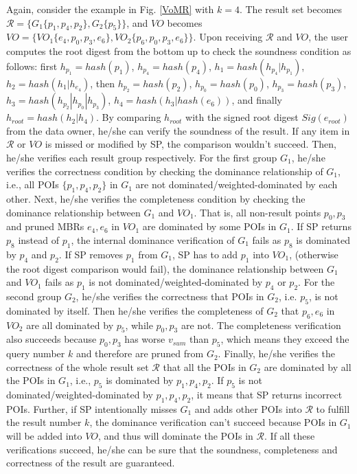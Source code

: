 \documentclass[10pt, conference, compsocconf]{IEEEtran}
\begin{document}
Again, consider the example in Fig. \ref{VoMR} with $k=4$. The result set becomes $\mathcal{R} = \{G_1\{p_{1}, p_{4}, p_{2}\}, G_2\{p_{5}\}\}$, and $VO$ becomes $VO= \{VO_1\{e_{4}, p_{0}, p_{3}, e_{6}\},VO_2\{p_{6}, p_{0}, p_{3}, e_{6}\}\}$. Upon receiving $\mathcal{R}$ and $VO$, the user computes the root digest from the bottom up to check the soundness condition as follows: first $h_{p_1} = hash(p_1)$, $h_{p_4} = hash(p_4)$, $h_{1} = hash(h_{p_4}|h_{p_1})$, $h_{2} = hash(h_1|h_{e_4})$, then $h_{p_2} = hash(p_2)$, $h_{p_0} = hash(p_0)$, $h_{p_3} = hash(p_3)$, $h_{3} =hash(h_{p_2}|h_{p_0}|h_{p_3}) $, $h_4 = hash(h_3 | hash(e_6))$, and finally $h_{root} = hash(h_{2} | h_{4})$. By comparing $h_{root}$ with the signed root digest $Sig(e_{root})$ from the data owner, he/she can verify the soundness of the result. If any item in $\mathcal{R}$ or $VO$ is missed or modified by SP, the comparison wouldn't succeed. Then, he/she verifies each result group respectively. For the first group $G_1$, he/she verifies the correctness condition by checking the dominance relationship of $G_1$, i.e., all POIs $\{p_1, p_4, p_2\}$ in $G_1$ are not dominated/weighted-dominated by each other. Next, he/she verifies the completeness condition by checking the dominance relationship between $G_1$ and $VO_1$. That is, all non-result points $p_0, p_3$ and pruned MBRs $e_4, e_6$ in $VO_1$ are dominated by some POIs in $G_1$. If SP returns $p_8$ instead of $p_1$, the internal dominance verification of $G_1$ fails as $p_8$ is dominated by $p_4$ and $p_2$. If SP removes $p_1$ from $G_1$, SP has to add $p_1$ into $VO_1$, (otherwise the root digest comparison would fail), the dominance relationship between $G_1$ and $VO_1$ fails as $p_1$ is not dominated/weighted-dominated by $p_4$ or $p_2$. For the second group $G_2$, he/she verifies the correctness that POIs in $G_2$, i.e. $p_{5}$, is not dominated by itself. Then he/she verifies the completeness of $G_2$ that $p_{6}, e_{6}$ in $VO_2$ are all dominated by $p_{5}$, while $p_{0}, p_{3}$ are not. The completeness verification also succeeds because $p_{0}, p_{3}$ has worse $v_{sum}$ than $p_5$, which means they exceed the query number $k$ and therefore are pruned from $G_2$. Finally, he/she verifies the correctness of the whole result set $\mathcal{R}$ that all the POIs in $G_2$ are dominated by all the POIs in $G_1$, i.e., $p_{5}$ is dominated by $p_{1}, p_{4}, p_{2}$. If $p_{5}$ is not dominated/weighted-dominated by $p_{1}, p_{4}, p_{2}$, it means that SP returns incorrect POIs. Further, if SP intentionally misses $G_1$ and adds other POIs into $\mathcal{R}$ to fulfill the result number $k$, the dominance verification can't succeed because POIs in $G_1$ will be added into $VO$, and thus will dominate the POIs in $\mathcal{R}$. If all these verifications succeed, he/she can be sure that the soundness, completeness and correctness of the result are guaranteed.
\end{document}
